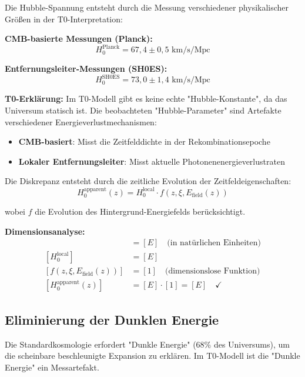 \documentclass[12pt,a4paper]{report}
\begin{document}
	Die Hubble-Spannung entsteht durch die Messung verschiedener physikalischer Größen in der T0-Interpretation:
	
	\textbf{CMB-basierte Messungen (Planck):}
	\begin{equation}
		H_0^{\text{Planck}} = 67,4 \pm 0,5 \text{ km/s/Mpc}
	\end{equation}
	
	\textbf{Entfernungsleiter-Messungen (SH0ES):}
	\begin{equation}
		H_0^{\text{SH0ES}} = 73,0 \pm 1,4 \text{ km/s/Mpc}
	\end{equation}
	
	\textbf{T0-Erklärung:}
	Im T0-Modell gibt es keine echte "Hubble-Konstante", da das Universum statisch ist. Die beobachteten "Hubble-Parameter" sind Artefakte verschiedener Energieverlustmechanismen:
	
	\begin{itemize}
		\item \textbf{CMB-basiert}: Misst die Zeitfelddichte in der Rekombinationsepoche
		\item \textbf{Lokaler Entfernungsleiter}: Misst aktuelle Photonenenergieverlustraten
	\end{itemize}
	
	Die Diskrepanz entsteht durch die zeitliche Evolution der Zeitfeldeigenschaften:
	\begin{equation}
		H_0^{\text{apparent}}(z) = H_0^{\text{local}} \cdot f(z, \xi, E_{\text{field}}(z))
	\end{equation}
	
	wobei $f$ die Evolution des Hintergrund-Energiefelds berücksichtigt.
	
	\textbf{Dimensionsanalyse:}
	\begin{align}
		[H_0^{\text{apparent}}(z)] &= [E] \quad \text{(in natürlichen Einheiten)} \\
		[H_0^{\text{local}}] &= [E] \\
		[f(z, \xi, E_{\text{field}}(z))] &= [1] \quad \text{(dimensionslose Funktion)} \\
		[H_0^{\text{apparent}}(z)] &= [E] \cdot [1] = [E] \quad \checkmark
	\end{align}
	
	\subsection{Eliminierung der Dunklen Energie}
	\label{subsec:dark_energy_elimination}
	
	Die Standardkosmologie erfordert "Dunkle Energie" (68\% des Universums), um die scheinbare beschleunigte Expansion zu erklären. Im T0-Modell ist die "Dunkle Energie" ein Messartefakt.
	
\end{document}
